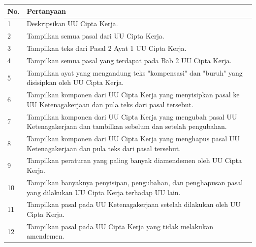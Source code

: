 \begin{longtable}[l]{|p{} | p{}|}
  \hline
  \textbf{No.} & \textbf{Pertanyaan}                                                                                                         \\ \hline \endhead
  1            & Deskripsikan UU Cipta Kerja.                                                                                                \\ \hline
  2            & Tampilkan semua pasal dari UU Cipta Kerja.                                                                                  \\ \hline
  3            & Tampilkan teks dari Pasal 2 Ayat 1 UU Cipta Kerja.                                                                          \\ \hline
  4            & Tampilkan semua pasal yang terdapat pada Bab 2 UU Cipta Kerja.                                                              \\ \hline
  5            & Tampilkan ayat yang mengandung teks "kompensasi" dan "buruh" yang disisipkan oleh  UU Cipta Kerja.                          \\ \hline
  6            & Tampilkan komponen dari UU Cipta Kerja yang menyisipkan pasal ke UU Ketenagakerjaan dan pula teks dari pasal tersebut.      \\ \hline
  7            & Tampilkan komponen dari UU Cipta Kerja yang mengubah pasal UU Ketenagakerjaan dan tambilkan sebelum dan setelah pengubahan. \\ \hline
  8            & Tampilkan komponen dari UU Cipta Kerja yang menghapus pasal UU Ketenagakerjaan dan pula teks dari pasal tersebut.           \\ \hline
  9            & Tampilkan peraturan yang paling banyak diamendemen oleh UU Cipta Kerja.                                                     \\ \hline
  10           & Tampilkan banyaknya penyisipan, pengubahan, dan penghapusan pasal yang dilakukan UU Cipta Kerja terhadap UU lain.                 \\ \hline
  11           & Tampilkan pasal pada UU Ketenagakerjaan setelah dilakukan oleh UU Cipta Kerja.                                              \\ \hline
  12           & Tampilkan pasal pada UU Cipta Kerja yang tidak melakukan amendemen.                                                         \\ \hline

\end{longtable}
